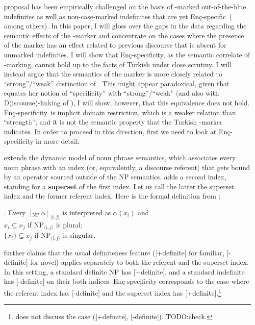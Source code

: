 \documentclass[11pt,a4paper]{article}
\newcommand{\encspec}{Enç-specific}
\begin{document}
	 proposal has been empirically challenged on the basis of \acc-marked out-of-the-blue indefinites as well as non-case-marked indefinites that are yet \encspec\ ( among others).  In this paper, I will gloss over the gaps in the data regarding the semantic effects of the \acc-marker and concentrate on the cases where the presence of the marker has an effect related to previous discourse that is absent for unmarked indefinites. I will show that \encspec ity, as the semantic correlate of \acc-marking, cannot hold up to the facts of Turkish under close scrutiny. I will instead argue that the semantics of the marker is more closely related to ``strong''/``weak'' distinction of .  This might appear paradoxical, given that  equates her notion of ``specificity'' with ``strong''/``weak'' (and also with D(iscourse)-linking of ), I will show, however, that this equivalence does not hold.  \encspec ity\ is implicit domain restriction, which is a weaker relation than ``strength''; and it is not the semantic property that the Turkish \acc-marker indicates. In order to proceed in this direction, first we need to look at \encspec ity in more detail.

 extends the dynamic model of noun phrase semantics, which associates every noun phrase with an index (or, equivalently, a discourse referent) that gets bound by an operator sourced outside of the NP semantics.  adds a second index, standing for a \textbf{superset} of the first index. Let us call the latter the superset index and the former referent index. Here is the formal definition from :

\ex.\label{encform} Every $[_{\text{NP}}\  \alpha ]_{\langle i,j\rangle}$ is interpreted as
$\alpha(x_i)$ and\\
$x_i \subseteq x_j$ if $\text{NP}_{\langle i,j\rangle}$ is plural;\\
$\{x_i\} \subseteq x_j$ if $\text{NP}_{\langle i,j\rangle}$ is
singular.

 further claims that the usual definiteness feature ([+definite] for familiar, [-definite] for novel) applies separately to both the referent and the superset index. In this setting, a standard definite NP has [+definite], and a standard indefinite has [-definite] on their both indices. \encspec ity corresponds to the case where the referent index has [-definite] and the superset index has [+definite].\footnote{ does not discuss the case ([+definite], [-definite]). TODO:check.}
\end{document}
